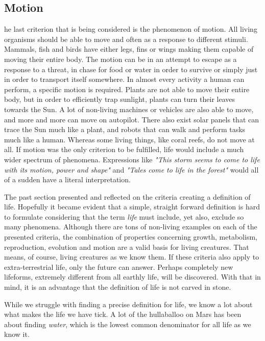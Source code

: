 \subsection{Motion}
he last criterion that is being considered is the phenomenon of motion.
All living organisms should be able to move and often as a response to different stimuli.
Mammals, fish and birds have either legs, fins or wings making them capable of moving their entire body.
The motion can be in an attempt to escape as a response to a threat, in chase for food or water in order to survive or simply just in order to transport itself somewhere.
In almost every activity a human can perform, a specific motion is required.
Plants are not able to move their entire body, but in order to efficiently trap sunlight, plants can turn their leaves towards the Sun.
A lot of non-living machines or vehicles are also able to move, and more and more can move on autopilot.
There also exist solar panels that can trace the Sun much like a plant, and robots that can walk and perform tasks much like a human.
Whereas some living things, like coral reefs, do not move at all.
If motion was the only criterion to be fulfilled, life would include a much wider spectrum of phenomena.
Expressions like \emph{"This storm seems to come to life with its motion, power and shape"} and \emph{"Tales come to life in the forest"} would all of a sudden have a literal interpretation. 


The past section presented and reflected on the criteria creating a definition of life.
Hopefully it became evident that a simple, straight forward definition is hard to formulate considering that the term \textit{life} must include, yet also, exclude so many phenomena.
Although there are tons of non-living examples on each of the presented criteria, the combination of properties concerning growth, metabolism, reproduction, evolution and motion are a valid basis for living creatures.
That means, of course, living creatures as we know them.
If these criteria also apply to extra-terrestrial life, only the future can answer.
Perhaps completely new lifeforms, extremely different from all earthly life, will be discovered.
With that in mind, it is an advantage that the definition of life is not carved in stone. 


While we struggle with finding a precise definition for life, we know a lot about what makes the life we have tick. A lot of the hullaballoo on Mars has been about finding \emph{water}, which is the lowest common denominator for all life as we know it. 